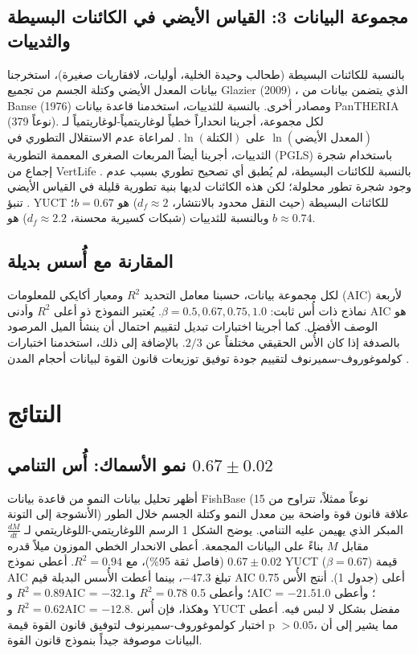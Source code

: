 \documentclass[11pt,a4paper]{article}
\newcommand{\df}{d_f}
\begin{document}
	\subsection{مجموعة البيانات 3: القياس الأيضي في الكائنات البسيطة والثدييات}
	
	بالنسبة للكائنات البسيطة (طحالب وحيدة الخلية، أوليات، لافقاريات صغيرة)، استخرجنا بيانات المعدل الأيضي وكتلة الجسم من تجميع Glazier (2009) \cite{Glazier2009}، الذي يتضمن بيانات من Banse (1976) \cite{Banse1976} ومصادر أخرى. بالنسبة للثدييات، استخدمنا قاعدة بيانات PanTHERIA \cite{PanTHERIA} (379 نوعاً). لكل مجموعة، أجرينا انحداراً خطياً لوغاريتمياً-لوغاريتمياً لـ \(\ln(\text{المعدل الأيضي})\) على \(\ln(\text{الكتلة})\). لمراعاة عدم الاستقلال التطوري في الثدييات، أجرينا أيضاً المربعات الصغرى المعممة التطورية (PGLS) باستخدام شجرة إجماع من VertLife \cite{VertLife}. بالنسبة للكائنات البسيطة، لم يُطبق أي تصحيح تطوري بسبب عدم وجود شجرة تطور محلولة؛ لكن هذه الكائنات لديها بنية تطورية قليلة في القياس الأيضي \cite{Glazier2005}. تنبؤ YUCT للكائنات البسيطة (حيث النقل محدود بالانتشار، \(\df \approx 2\)) هو \(b = 0.67\)؛ وبالنسبة للثدييات (شبكات كسيرية محسنة، \(\df \approx 2.2\)) هو \(b \approx 0.74\).
	
	\subsection{المقارنة مع أُسس بديلة}
	
	لكل مجموعة بيانات، حسبنا معامل التحديد \(R^2\) ومعيار أكايكي للمعلومات (AIC) لأربعة نماذج ذات أُس ثابت: \(\beta = 0.5, 0.67, 0.75, 1.0\). يُعتبر النموذج ذو أعلى \(R^2\) وأدنى AIC هو الوصف الأفضل. كما أجرينا اختبارات تبديل لتقييم احتمال أن ينشأ الميل المرصود بالصدفة إذا كان الأُس الحقيقي مختلفاً عن \(2/3\). بالإضافة إلى ذلك، استخدمنا اختبارات كولموغوروف-سميرنوف لتقييم جودة توفيق توزيعات قانون القوة لبيانات أحجام المدن \cite{Clauset2009}.
	
	\section{النتائج}
	
	\subsection{نمو الأسماك: أُس التنامي \(0.67 \pm 0.02\)}
	
	أظهر تحليل بيانات النمو من قاعدة بيانات FishBase (15 نوعاً ممثلاً، تتراوح من الأنشوجة إلى التونة) علاقة قانون قوة واضحة بين معدل النمو وكتلة الجسم خلال الطور المبكر الذي يهيمن عليه التنامي. يوضح الشكل 1 الرسم اللوغاريتمي-اللوغاريتمي لـ \(\frac{dM}{dt}\) مقابل \(M\) بناءً على البيانات المجمعة. أعطى الانحدار الخطي الموزون ميلاً قدره \(0.67 \pm 0.02\) (فاصل ثقة 95\%)، مع \(R^2 = 0.94\). أعطى نموذج YUCT (\(\beta = 0.67\)) قيمة AIC تبلغ \(-47.3\)، بينما أعطت الأُسس البديلة قيم AIC أعلى (جدول 1). أنتج الأُس 0.75 \(R^2 = 0.89\) وAIC = \(-32.1\)؛ وأعطى 0.5 \(R^2 = 0.78\) وAIC = \(-21.5\)؛ وأعطى 1.0 \(R^2 = 0.62\) وAIC = \(-12.8\). وهكذا، فإن أُس YUCT مفضل بشكل لا لبس فيه. أعطى اختبار كولموغوروف-سميرنوف لتوفيق قانون القوة قيمة p \(>0.05\)، مما يشير إلى أن البيانات موصوفة جيداً بنموذج قانون القوة.
	
\end{document}
